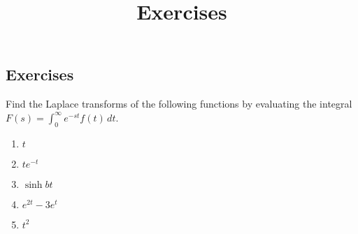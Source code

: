 \documentclass{ximera}
\title{Exercises} \license{CC BY-NC-SA 4.0}
\begin{document}
\begin{abstract}
\end{abstract}
\maketitle

\begin{onlineOnly}
\section*{Exercises}
\end{onlineOnly}


\begin{problem}\label{exer:8.1.1}
Find the Laplace transforms of the following functions by evaluating
the integral $F(s)=\int_0^\infty e^{-st} f(t)\,dt$.

\begin{enumerate}
    \item $t$
    
    \begin{solution}
        
    \end{solution}
    
    \item $te^{-t}$ 
    \item $\sinh bt$
    \item $e^{2t}-3e^t$
    \item $t^2$
\end{enumerate}
\end{problem}
\end{document}
